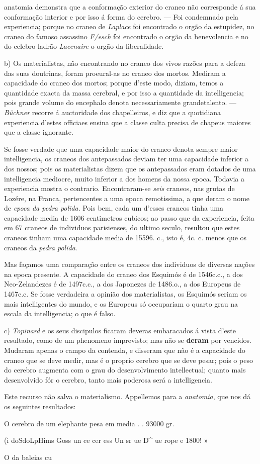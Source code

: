 anatomia demonstra que a conformação exterior do craneo não corresponde á sua conformação interior e por isso á forma do cerebro. --- Foi condemnado pela experiencia; porque no craneo de \emph{Laplace} foi encontrado o orgão da estupidez, no craneo do famoso assassino \emph{F/esch} foi encontrado o orgão da benevolencia e no do celebro ladrão \emph{Lacenaire} o orgão da liberalidade.\par b) Os materialistas, não encontrando no craneo dos vivos razões para a defeza das suas doutrinas, foram proeural-as no craneo dos mortos. Mediram a capacidade do craneo dos mortos; porque d'este modo, diziam, temos a quantidade exacta da massa cerebral, e por isso a quantidade da intelligencia; pois grande volume do encephalo denota necessariamente grandetalento. --- \emph{Büchner} recorre á auctoridade dos chapelleiros, e diz que a quotidiana experiencia d'estes officiaes ensina que a classe culta precisa de chapeus maiores que a classe ignorante.\par Se fosse verdade que uma capacidade maior do craneo denota sempre maior intelligencia, os craneos dos antepassados deviam ter uma capacidade inferior a dos nossos; pois os materialistas dizem que os antepassados eram dotados de uma intelligencia mediocre, muito inferior a dos homens da nossa epoca. Todavia a experiencia mostra o contrario. Encontraram-se \emph{seis} craneos, nas grutas de Lozére, na Franca, pertencentes a uma epoca remotissima, a que deram o nome de \emph{epoca da pedra polida}. Pois bem, cada um d'esses craneos tinha uma capacidade media de 1606 centimetros cubicos; ao passo que da experiencia, feita em 67 craneos de individuos parisienses, do ultimo seculo, resultou que estes craneos tinham uma capacidade media de 15596. c., isto é, 4c. c. menos que os craneos da \emph{pedra polida}.\par Mas façamos uma comparação entre os craneos dos individuos de diversas nações na epoca presente. A capacidade do craneo dos Esquimós é de 1546c.c., a dos Neo-Zelandezes é de 1497c.c., a dos Japonezes de 1486.o., a dos Europeus de 1467e.c. Se fosse verdadeira a opinião dos materialistas, os Esquimós seriam os mais intelligentes do mundo, e os Europeus só occupariam o quarto grau na escala da intelligencia; o que é falso.\par c) \emph{Topinard} e os seus discipulos ficaram deveras embaracados á vista d'este resultado, como de um phenomeno imprevisto; mas não se \textbf{deram} por vencidos. Mudaram apenas o campo da contenda, e disseram que não é a capacidade do craneo que se deve medir, mas é o proprio cerebro que se deve pesar; pois o peso do cerebro augmenta com o grau do desenvolvimento intellectual; quanto mais desenvolvido fór o cerebro, tanto mais poderosa será a intelligencia.\par Este recurso não salva o materialismo. Appellemos para a \emph{anatomia}, que nos dá os seguintes resultados:\par O cerebro de um elephante pesa em media . . 93000 gr.\par (i doSdoLpHims Goss un ce cer ess Un sr ue D\textasciicircum{} ue rope e 1800! »\par O da baleias cu 